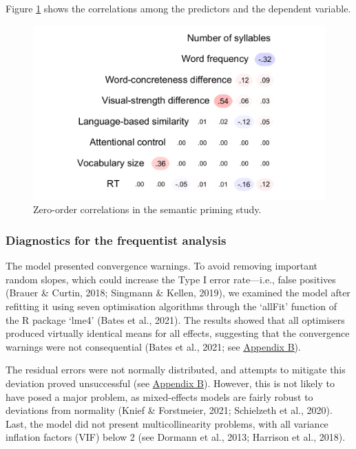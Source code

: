 \documentclass[
  12pt,
  man,floatsintext]{apa7}
\begin{document}
Figure \ref{fig:semanticpriming-correlations} shows the correlations among the predictors and the dependent variable.

\begin{figure}

{\centering \includegraphics[width=0.65\linewidth]{manuscript_files/figure-latex/semanticpriming-correlations-1} 

}

\caption{Zero-order correlations in the semantic priming study.}\label{fig:semanticpriming-correlations}
\end{figure}

\hypertarget{diagnostics-for-the-frequentist-analysis}{%
\subsubsection{Diagnostics for the frequentist analysis}\label{diagnostics-for-the-frequentist-analysis}}

The model presented convergence warnings. To avoid removing important random slopes, which could increase the Type I error rate---i.e., false positives (Brauer \& Curtin, 2018; Singmann \& Kellen, 2019), we examined the model after refitting it using seven optimisation algorithms through the `allFit' function of the R package `lme4' (Bates et al., 2021). The results showed that all optimisers produced virtually identical means for all effects, suggesting that the convergence warnings were not consequential (Bates et al., 2021; see \protect\hyperlink{appendix-B-frequentist-analysis-diagnostics}{\underline{Appendix B}}).

The residual errors were not normally distributed, and attempts to mitigate this deviation proved unsuccessful (see \protect\hyperlink{appendix-B-frequentist-analysis-diagnostics}{\underline{Appendix B}}). However, this is not likely to have posed a major problem, as mixed-effects models are fairly robust to deviations from normality (Knief \& Forstmeier, 2021; Schielzeth et al., 2020). Last, the model did not present multicollinearity problems, with all variance inflation factors (VIF) below 2 (see Dormann et al., 2013; Harrison et al., 2018).
\end{document}
